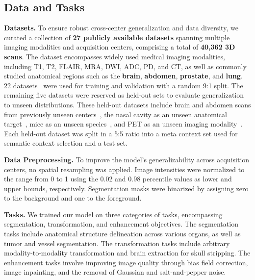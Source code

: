\subsection{Data and Tasks}
\noindent\textbf{Datasets.}
To ensure robust cross-center generalization and data diversity, we curated a collection of \textbf{27 publicly available datasets} spanning multiple imaging modalities and acquisition centers, comprising a total of \textbf{40{,}362 3D scans}. The dataset encompasses widely used medical imaging modalities, including T1, T2, FLAIR, MRA, DWI, ADC, PD, and CT, as well as commonly studied anatomical regions such as the \textbf{brain}, \textbf{abdomen}, \textbf{prostate}, and \textbf{lung}. 22 datasets~\cite{yang2023benchmarking, CAS2023, hernandez2022isles, liew2022large, IXI, hoopes2022learning, marcus2007open, flanders2020construction, ADHD, jack2008alzheimer, alexander2017open, holmes2015brain, gera2023characterizing, nugent2022nimh, sudlow2015uk, menze2014multimodal, litjens2014evaluation, kuijf2019standardized, zeng2023imagecas, ji2022amos, luo2024rethinking, wasserthal2023totalsegmentator, antonelli2022medical} were used for training and validation with a random 9:1 split. The remaining five datasets were reserved as held-out sets to evaluate generalization to unseen distributions. These held-out datasets include brain and abdomen scans from previously unseen centers~\cite{marek2011parkinson, ma2024unleashing}, the nasal cavity as an unseen anatomical target~\cite{zhang2024nasalseg}, mice as an unseen species~\cite{rosenhain2018preclinical}, and PET as an unseen imaging modality~\cite{jack2008alzheimer}. Each held-out dataset was split in a 5:5 ratio into a meta context set used for semantic context selection and a test set.


\vspace{0.4em} \noindent\textbf{Data Preprocessing.} To improve the model's generalizability across acquisition centers, no spatial resampling was applied. Image intensities were normalized to the range from 0 to 1 using the 0.02 and 0.98 percentile values as lower and upper bounds, respectively. 
Segmentation masks were binarized by assigning zero to the background and one to the foreground.


\vspace{0.4em}
\noindent\textbf{Tasks.}  
We trained our model on three categories of tasks, encompassing segmentation, transformation, and enhancement objectives. The segmentation tasks include anatomical structure delineation across various organs, as well as tumor and vessel segmentation. The transformation tasks include arbitrary modality-to-modality transformation and brain extraction for skull stripping. The enhancement tasks involve improving image quality through bias field correction, image inpainting, and the removal of Gaussian and salt-and-pepper noise.

